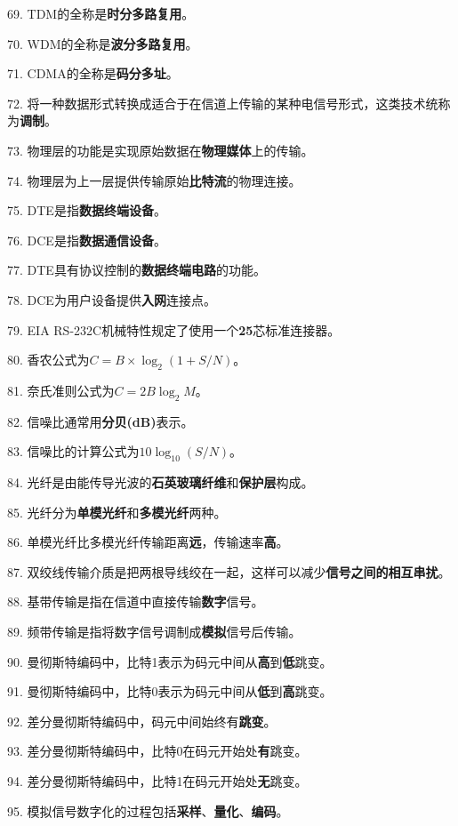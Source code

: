 \documentclass[12pt,a4paper,openany]{ctexbook}
\begin{document}
69. TDM的全称是\textbf{时分多路复用}。

70. WDM的全称是\textbf{波分多路复用}。

71. CDMA的全称是\textbf{码分多址}。

72. 将一种数据形式转换成适合于在信道上传输的某种电信号形式，这类技术统称为\textbf{调制}。

73. 物理层的功能是实现原始数据在\textbf{物理媒体}上的传输。

74. 物理层为上一层提供传输原始\textbf{比特流}的物理连接。

75. DTE是指\textbf{数据终端设备}。

76. DCE是指\textbf{数据通信设备}。

77. DTE具有协议控制的\textbf{数据终端电路}的功能。

78. DCE为用户设备提供\textbf{入网}连接点。

79. EIA RS-232C机械特性规定了使用一个\textbf{25}芯标准连接器。

80. 香农公式为\textbf{$C=B\times\log_2(1+S/N)$}。

81. 奈氏准则公式为\textbf{$C=2B\log_2M$}。

82. 信噪比通常用\textbf{分贝(dB)}表示。

83. 信噪比的计算公式为\textbf{$10\log_{10}(S/N)$}。

84. 光纤是由能传导光波的\textbf{石英玻璃纤维}和\textbf{保护层}构成。

85. 光纤分为\textbf{单模光纤}和\textbf{多模光纤}两种。

86. 单模光纤比多模光纤传输距离\textbf{远}，传输速率\textbf{高}。

87. 双绞线传输介质是把两根导线绞在一起，这样可以减少\textbf{信号之间的相互串扰}。

88. 基带传输是指在信道中直接传输\textbf{数字}信号。

89. 频带传输是指将数字信号调制成\textbf{模拟}信号后传输。

90. 曼彻斯特编码中，比特1表示为码元中间从\textbf{高}到\textbf{低}跳变。

91. 曼彻斯特编码中，比特0表示为码元中间从\textbf{低}到\textbf{高}跳变。

92. 差分曼彻斯特编码中，码元中间始终有\textbf{跳变}。

93. 差分曼彻斯特编码中，比特0在码元开始处\textbf{有}跳变。

94. 差分曼彻斯特编码中，比特1在码元开始处\textbf{无}跳变。

95. 模拟信号数字化的过程包括\textbf{采样}、\textbf{量化}、\textbf{编码}。
\end{document}
